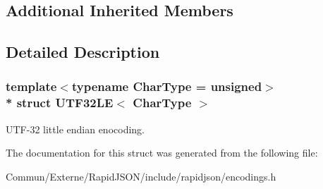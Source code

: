 \subsection*{Additional Inherited Members}


\subsection{Detailed Description}
\subsubsection*{template$<$typename Char\+Type = unsigned$>$\\*
struct U\+T\+F32\+L\+E$<$ Char\+Type $>$}

U\+T\+F-\/32 little endian enocoding. 

The documentation for this struct was generated from the following file\+:\begin{DoxyCompactItemize}
\item 
Commun/\+Externe/\+Rapid\+J\+S\+O\+N/include/rapidjson/encodings.\+h\end{DoxyCompactItemize}
